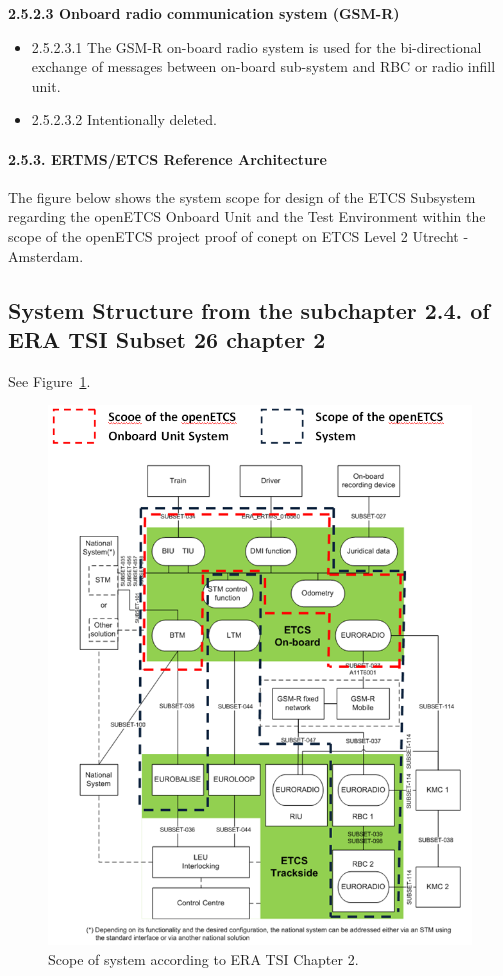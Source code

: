 \textbf{2.5.2.3	Onboard radio communication system (GSM-R)}
\begin{itemize}
\item 2.5.2.3.1	The GSM-R on-board radio system is used for the bi-directional exchange of messages between on-board sub-system and RBC or radio infill unit. 
\item 2.5.2.3.2	Intentionally deleted.
\end{itemize}

\paragraph{2.5.3. ERTMS/ETCS Reference Architecture}
The figure below shows the system scope for design of the ETCS Subsystem regarding the openETCS Onboard Unit and the Test Environment within the scope of the openETCS project proof of conept on ETCS Level 2 Utrecht - Amsterdam.

\subsection{System Structure from the subchapter 2.4. of ERA TSI Subset 26 chapter 2}
See Figure~\ref{Scope of System according to ERA TSI Chapter 2}.
\begin{figure}
\includegraphics[width=.9\textwidth]{images/ArchitectureSRS}
\caption{Scope of system according to ERA TSI Chapter 2.}
\label{Scope of System according to ERA TSI Chapter 2}
\end{figure}

